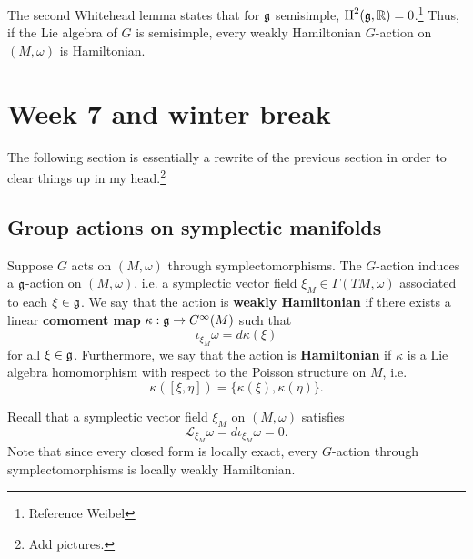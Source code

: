 \documentclass{amsart}
\begin{document}
\begin{example}
    The second Whitehead lemma states that for $\mathfrak g$ semisimple, $\operatorname{H}^2(\mathfrak g,\mathbb{R})=0$.\footnote{Reference Weibel}
    Thus, if the Lie algebra of $G$ is semisimple, every weakly Hamiltonian $G$-action on
    $(M,\omega)$ is Hamiltonian.
\end{example}

\newpage
\section{Week 7 and winter break}

The following section is essentially a rewrite of the previous section in order
to clear things up in my head.\footnote{Add pictures.}

\subsection{Group actions on symplectic manifolds}

\begin{definition}
    Suppose $G$ acts on $(M,\omega)$ through symplectomorphisms. The $G$-action
    induces a $\mathfrak g$-action on $(M,\omega)$, i.e. a symplectic vector field $\xi_M\in\Gamma(TM,\omega)$
    associated to each $\xi\in\mathfrak g$. We say that the action is \textbf{weakly Hamiltonian}
    if there exists a linear \textbf{comoment map} $\kappa:\mathfrak g\to C^\infty(M)$ such
    that
    \begin{equation*}
        \iota_{\xi_M}\omega = d\kappa(\xi)
    \end{equation*}
    for all $\xi\in\mathfrak g$. Furthermore, we say that the action is \textbf{Hamiltonian}
    if $\kappa$ is a Lie algebra homomorphism with respect to the Poisson structure on $M$,
    i.e.
    \begin{equation*}
        \kappa([\xi,\eta]) = \{\kappa(\xi),\kappa(\eta)\}.
    \end{equation*}
\end{definition}

\begin{remark}
    Recall that a symplectic vector field $\xi_M$ on $(M,\omega)$ satisfies
    \begin{equation*}
        \mathcal{L}_{\xi_M}\omega = d\iota_{\xi_M}\omega = 0.
    \end{equation*}
    Note that since every closed form is locally exact, every $G$-action through symplectomorphisms
    is locally weakly Hamiltonian.
    \label{rem:lwh}
\end{remark}
\end{document}
